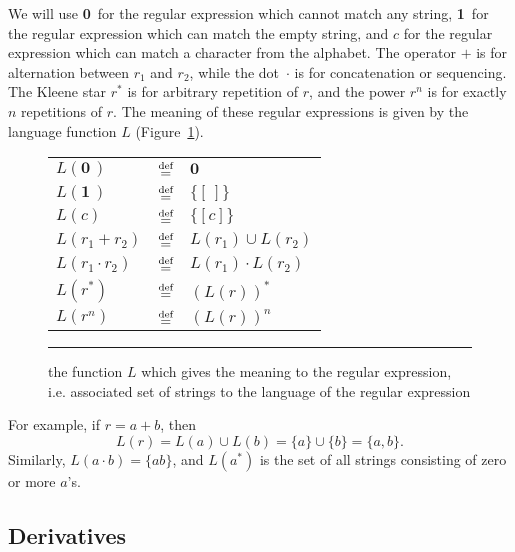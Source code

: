 \documentclass[12pt]{article}
\newcommand{\dn}{\ensuremath{\stackrel{\mbox{\scriptsize def}}{=}}}
\newcommand{\ZERO}{\textbf{0}}
\newcommand{\ONE}{\textbf{1}}
\newcommand{\emptylist}{[\,]}
\begin{document}
We will use \ZERO\ for the regular expression which cannot match any string, \ONE\ for
the regular expression which can match the empty string, and $c$ for the regular expression
which can match a character from the alphabet. The operator $+$ is for alternation between
$r_1$ and $r_2$, while the dot~$\cdot$ is for concatenation or sequencing. The Kleene star
$r^\ast$ is for arbitrary repetition of $r$, and the power $r^n$ is for exactly
$n$ repetitions of $r$. The meaning of these regular expressions is given by the language function
 $L$ (Figure~\ref{lFunction}).
\begin{figure}[ht]
\begin{center}
  \renewcommand{\arraystretch}{1.5}
  \begin{tabular}{lcl}
    $L(\ZERO\,)$            & \dn & $\ZERO$ \\
    $L(\ONE\,)$             & \dn & $\{\emptylist\}$ \\
    $L(c)$                  & \dn & $\{[c]\}$ \\
    $L(r_1 + r_2)$          & \dn & $L(r_1) \cup L(r_2)$ \\
    $L(r_1 \cdot r_2)$      & \dn & $L(r_1) \cdot L(r_2)$ \\
    $L(r^\ast)$             & \dn & $(L(r))^\ast$ \\
    $L(r^n)$                & \dn & $(L(r))^n$
  \end{tabular}
  \renewcommand{\arraystretch}{1.0}
  \mbox{}
     \rule{\linewidth}{0.4pt}
  \caption{the function $L$ which gives the meaning to the regular expression, i.e. associated
   set of strings to the language of the regular expression}\label{lFunction}
  \end{center}
\end{figure}
For example, if $r = a + b$, then
\[
L(r) = L(a) \cup L(b) = \{a\} \cup \{b\} = \{a, b\}.
\]
\noindent Similarly, $L(a \cdot b) = \{ab\}$, and $L(a^*)$ is the set of all strings 
consisting of zero or more $a$'s.

\FloatBarrier
\subsection{Derivatives}
\end{document}
